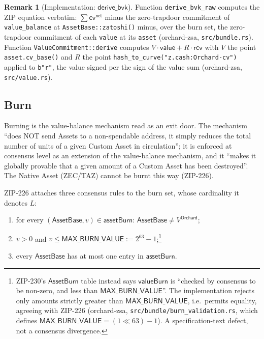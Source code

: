 \documentclass[11pt,a4paper]{article}
\theoremstyle{definition}
\newtheorem{remark}[theorem]{Remark}
\newcommand{\cvsym}{\mathsf{cv}}
\newcommand{\rcv}{\ensuremath{\mathsf{rcv}}}
\begin{document}
\begin{remark}[Implementation: $\mathsf{derive\_bvk}$]\label{rem:zsa-bvk-impl}
Function \texttt{derive\_bvk\_raw} computes the ZIP equation verbatim:
$\sum \cvsym^{\mathsf{net}}$ minus the zero-trapdoor commitment of
\texttt{value\_balance} at \texttt{AssetBase::zatoshi()} minus, over the
burn set, the zero-trapdoor commitment of each \texttt{value} at its
\texttt{asset} (\textsf{orchard-zsa}, \texttt{src/bundle.rs}). Function
\texttt{ValueCommitment::derive} computes $V \cdot \mathsf{value} + R \cdot
\rcv$ with $V$ the point \texttt{asset.cv\_base()} and $R$ the point
\texttt{hash\_to\_curve("z.cash:Orchard-cv")} applied to \texttt{b"r"},
the value signed per the sign of the value sum (\textsf{orchard-zsa},
\texttt{src/value.rs}).
\end{remark}

\subsection{Burn}\label{sec:zsa-burn}

Burning is the value-balance mechanism read as an exit door. The mechanism
``does NOT send Assets to a non-spendable address, it simply reduces the
total number of units of a given Custom Asset in circulation''; it is
enforced at consensus level as an extension of the value-balance mechanism,
and it ``makes it globally provable that a given amount of a Custom Asset
has been destroyed''. The Native Asset (ZEC/TAZ) cannot be burnt this way
(ZIP-226).

ZIP-226 attaches three consensus rules to the burn set, whose cardinality it
denotes $L$:
\begin{enumerate}[leftmargin=*]
\item for every $(\mathsf{AssetBase}, v) \in \mathsf{assetBurn}$:
  $\mathsf{AssetBase} \neq V^{\mathsf{Orchard}}$;
\item $v > 0$ and $v \leq \mathsf{MAX\_BURN\_VALUE} := 2^{63} - 1$;\footnote{%
ZIP-230's $\mathsf{AssetBurn}$ table instead says $\mathsf{valueBurn}$ is
``checked by consensus to be non-zero, and less than
$\mathsf{MAX\_BURN\_VALUE}$''. The implementation rejects only amounts
strictly greater than $\mathsf{MAX\_BURN\_VALUE}$, i.e.\ permits equality,
agreeing with ZIP-226 (\textsf{orchard-zsa},
\texttt{src/bundle/burn\_validation.rs}, which defines
$\mathsf{MAX\_BURN\_VALUE} = (1 \ll 63) - 1$). A specification-text defect,
not a consensus divergence.}
\item every $\mathsf{AssetBase}$ has at most one entry in
  $\mathsf{assetBurn}$.
\end{enumerate}
\end{document}
